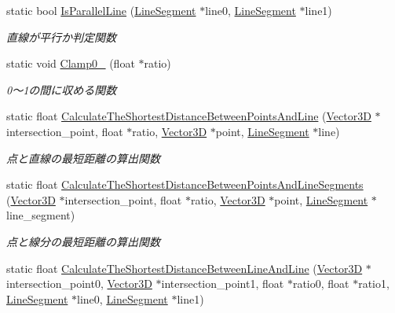 \begin{DoxyCompactItemize}
static bool \mbox{\hyperlink{class_collision_calculation_acb67c1f67d88b28ec254221d40811a3f}{Is\+Parallel\+Line}} (\mbox{\hyperlink{class_line_segment}{Line\+Segment}} $\ast$line0, \mbox{\hyperlink{class_line_segment}{Line\+Segment}} $\ast$line1)
\begin{DoxyCompactList}\small\item\em 直線が平行か判定関数 \end{DoxyCompactList}\item 
static void \mbox{\hyperlink{class_collision_calculation_a88c4903b9d8047a9eb8638974aa90279}{Clamp0\+\_}} (float $\ast$ratio)
\begin{DoxyCompactList}\small\item\em 0〜1の間に収める関数 \end{DoxyCompactList}\item 
static float \mbox{\hyperlink{class_collision_calculation_a2a625ad786269c8a8a7bc15268254fa5}{Calculate\+The\+Shortest\+Distance\+Between\+Points\+And\+Line}} (\mbox{\hyperlink{class_vector3_d}{Vector3D}} $\ast$intersection\+\_\+point, float $\ast$ratio, \mbox{\hyperlink{class_vector3_d}{Vector3D}} $\ast$point, \mbox{\hyperlink{class_line_segment}{Line\+Segment}} $\ast$line)
\begin{DoxyCompactList}\small\item\em 点と直線の最短距離の算出関数 \end{DoxyCompactList}\item 
static float \mbox{\hyperlink{class_collision_calculation_a5f27258e2c8f9c10adaa9f0a609e86af}{Calculate\+The\+Shortest\+Distance\+Between\+Points\+And\+Line\+Segments}} (\mbox{\hyperlink{class_vector3_d}{Vector3D}} $\ast$intersection\+\_\+point, float $\ast$ratio, \mbox{\hyperlink{class_vector3_d}{Vector3D}} $\ast$point, \mbox{\hyperlink{class_line_segment}{Line\+Segment}} $\ast$line\+\_\+segment)
\begin{DoxyCompactList}\small\item\em 点と線分の最短距離の算出関数 \end{DoxyCompactList}\item 
static float \mbox{\hyperlink{class_collision_calculation_ae9adc067d647f1ea540ed3f2915d46e4}{Calculate\+The\+Shortest\+Distance\+Between\+Line\+And\+Line}} (\mbox{\hyperlink{class_vector3_d}{Vector3D}} $\ast$intersection\+\_\+point0, \mbox{\hyperlink{class_vector3_d}{Vector3D}} $\ast$intersection\+\_\+point1, float $\ast$ratio0, float $\ast$ratio1, \mbox{\hyperlink{class_line_segment}{Line\+Segment}} $\ast$line0, \mbox{\hyperlink{class_line_segment}{Line\+Segment}} $\ast$line1)

\end{DoxyCompactItemize}
